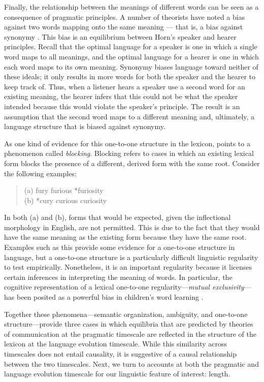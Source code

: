 \documentclass[man]{apa2}
\begin{document}
Finally, the relationship between the meanings of different words can be seen as a consequence of pragmatic principles. A number of theorists have noted a bias against two words mapping onto the same meaning --- that is, a bias against synonymy \cite{saussure, kiparsky1983word, horn1984, clark1987principle, clark1988logic}. This bias is an equilibrium between Horn's speaker and hearer principles. Recall that the optimal language for a speaker is one in which a single word maps to all meanings, and the optimal language for a hearer is one in which each word maps to its own meaning. Synonymy biases language toward neither of these ideals; it only results in more words for both the speaker and the hearer to keep track of.  Thus, when a listener hears a speaker use a second word for an existing meaning, the hearer infers that this could not be what the speaker intended because this would violate the speaker's principle. The result is  an assumption that the second word maps to a different meaning and, ultimately, a language structure that is biased against synonymy.

As one kind of evidence for this one-to-one structure in the lexicon,  points to a phenomenon called {\it blocking}. Blocking refers to cases in which an existing lexical form blocks the presence of a different, derived form with the same root. Consider the following examples:
 \begin{quote} 
 	(a) fury furious *furiosity\\
	(b) *cury curious curiosity 
\end{quote}
In both (a) and (b), forms that would be expected, given the inflectional morphology in English, are not permitted. This is due to the fact that they would have the same meaning as the existing form because they have the same root. Examples such as this provide some evidence for a one-to-one structure in language, but a one-to-one structure is a particularly difficult linguistic regularity to test empirically. Nonetheless, it is an important regularity because it licenses certain inferences in interpreting the meaning of words. In particular, the cognitive representation of a lexical one-to-one regularity---{\it mutual exclusivity}---has been posited as a powerful bias in children's word learning \cite{markman1988, markman2003}.

Together these phenomena---semantic organization, ambiguity, and one-to-one structure---provide three cases in which equilibria that are predicted by theories of communication at the pragmatic timescale are reflected in the structure of the lexicon at the language evolution timescale. While this similarity across timescales does not entail causality, it is suggestive of a causal relationship between the two timescales. Next, we turn to accounts at both the pragmatic and language evolution timescale for our linguistic feature of interest: length.
\end{document}

